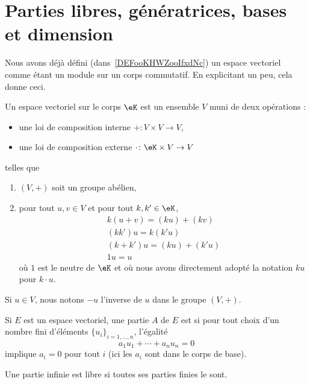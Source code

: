 
\section{Parties libres, génératrices, bases et dimension}

Nous avons déjà défini (dans~\ref{DEFooKHWZooIfxdNc}) un espace vectoriel comme étant un module sur un corps commutatif. En explicitant un peu, cela donne ceci\cite{ooQLVLooEUrNLS}.

Un espace vectoriel sur le corps \( \eK\) est un ensemble \( V\) muni de deux opérations :
\begin{itemize}
    \item une loi de composition interne \( +\colon V\times V\to V\),
    \item une loi de composition externe \( \cdot\colon \eK\times V\to V\)
\end{itemize}
telles que
\begin{enumerate}
    \item
        \( (V,+)\) soit un groupe abélien,
    \item
        pour tout \( u,v\in V\) et pour tout \( k,k'\in \eK\),
        \begin{subequations}
           \begin{align}
                k(u+v)=(ku)+(kv)\\
                (kk')u=k(k'u)\\
                (k+k')u=(ku)+(k'u)\\
                1u=u
            \end{align}
        \end{subequations}
        où \( 1\) est le neutre de \( \eK\) et où nous avons directement adopté la notation \( ku\) pour \( k\cdot u\).
\end{enumerate}
Si \( u\in V\), nous notons \( -u\) l'inverse de \( u\) dans le groupe \( (V,+)\).

\begin{definition}
    Si \( E\) est un espace vectoriel, une partie \( A\) de \( E\) est  si pour tout choix d'un nombre fini d'éléments \( \{ u_i \}_{i=1,\ldots, n}\), l'égalité
    \begin{equation}
        a_1 u_1+\cdots +a_nu_n=0
    \end{equation}
    implique \( a_i=0\) pour tout \( i\) (ici les \( a_i\) sont dans le corps de base).

    Une partie infinie est libre si toutes ses parties finies le sont.
\end{definition}

